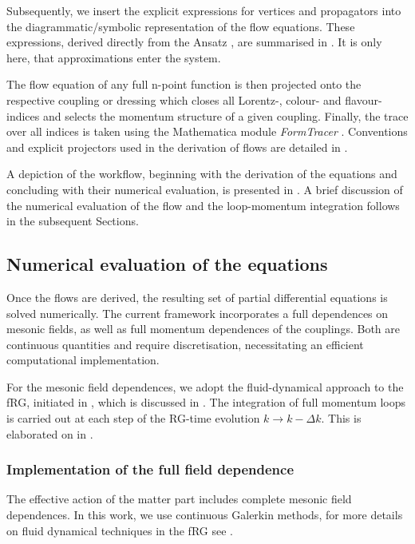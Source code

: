 \documentclass[aps,twocolumn,prd,superscriptaddress]{revtex4-2}
\begin{document}
Subsequently, we insert the explicit expressions for vertices and propagators into the diagrammatic/symbolic representation of the flow equations. These expressions, derived directly from the Ansatz , are summarised in . It is only here, that approximations enter the system.

The flow equation of any full n-point function is then projected onto the respective coupling or dressing which closes all Lorentz-, colour- and flavour-indices and selects the momentum structure of a given coupling.
Finally, the trace over all indices is taken using the Mathematica module \textit{FormTracer} \cite{Cyrol:2016zqb}. Conventions and explicit projectors used in the derivation of flows are detailed in .

A depiction of the workflow, beginning with the derivation of the equations and concluding with their numerical evaluation, is presented in . A brief discussion of the numerical evaluation of the flow and the loop-momentum integration follows in the subsequent Sections.


\subsection{Numerical evaluation of the equations}
\label{sec:implementation}

Once the flows are derived, the resulting set of partial differential equations is solved numerically. The current framework incorporates a full dependences on mesonic fields, as well as full momentum dependences of the couplings. Both are continuous quantities and require discretisation, necessitating an efficient computational implementation.

For the mesonic field dependences, we adopt the fluid-dynamical approach to the fRG, initiated in \cite{Grossi:2019urj}, which is discussed in .
The integration of full momentum loops is carried out at each step of the RG-time evolution $k \to k - \Delta k$. This is elaborated on in .


\subsubsection{Implementation of the full field dependence}
\label{sec:fluiddynamics}

The effective action of the matter part  includes complete mesonic field dependences. In this work, we use continuous Galerkin methods, for more details on fluid dynamical techniques in the fRG see \cite{Grossi:2019urj, Grossi:2021ksl, Ihssen:2022xkr, Ihssen:2023xlp, Koenigstein:2021rxj, Koenigstein:2021syz, Steil:2021cbu}.
\end{document}
